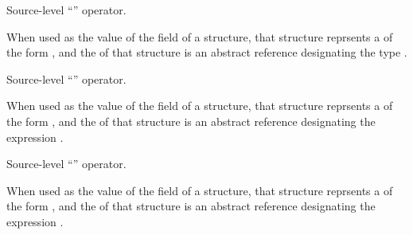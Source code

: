 Source-level ``'' operator.

When used as the value of the  field of a  structure, 
that structure reprsents a  of the form , 
and the  of that structure is an abstract reference designating the type .


Source-level ``'' operator.

When used as the value of the  field of a  structure, 
that structure reprsents a  of the form , 
and the  of that structure is an abstract reference designating the expression .


Source-level ``'' operator.

When used as the value of the  field of a  structure, 
that structure reprsents a  of the form , 
and the  of that structure is an abstract reference designating the expression .


